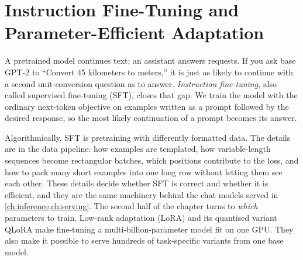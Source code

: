\chapter{Instruction Fine-Tuning and Parameter-Efficient Adaptation}\label{ch:instruct}

A pretrained model continues text; an assistant answers requests. If you ask base GPT-2
to ``Convert 45 kilometers to meters,'' it is just as likely to continue with a second
unit-conversion question as to answer. \emph{Instruction fine-tuning}, also called
supervised fine-tuning (SFT), closes that gap. We train the model with the ordinary
next-token objective on examples written as a prompt followed by the desired response,
so the most likely continuation of a prompt becomes its answer.

Algorithmically, SFT is pretraining with differently formatted data. The details are in
the data pipeline: how examples are templated, how variable-length sequences become
rectangular batches, which positions contribute to the loss, and how to pack many short
examples into one long row without letting them see each other. These details decide
whether SFT is correct and whether it is efficient, and they are the same machinery
behind the chat models served in \cref{ch:inference,ch:serving}. The second half of the
chapter turns to \emph{which} parameters to train. Low-rank adaptation (LoRA) and its
quantised variant QLoRA make fine-tuning a multi-billion-parameter model fit on one GPU.
They also make it possible to serve hundreds of task-specific variants from one base
model.


